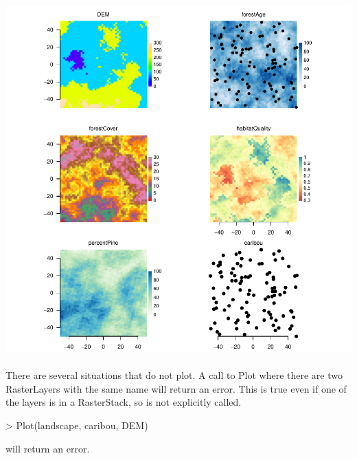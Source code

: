 \documentclass{article}
\begin{document}
\includegraphics{plotting-plot-using-files}

\paragraph{}
There are several situations that do not plot. A call to Plot where there are two RasterLayers with the same name will return an error. This is true even if one of the layers is in a RasterStack, so is not explicitly called.
\begin{Schunk}
\begin{Sinput}
> Plot(landscape, caribou, DEM)
\end{Sinput}
\end{Schunk}
will return an error.
\end{document}

